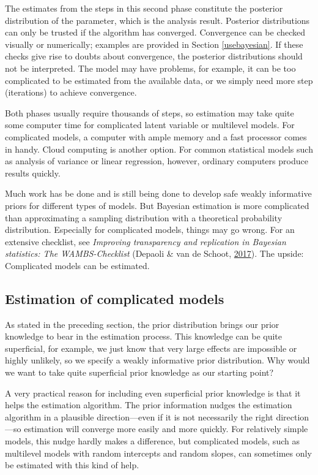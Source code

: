 \documentclass[doc]{apa6}
\begin{document}
The estimates from the steps in this second phase constitute the
posterior distribution of the parameter, which is the analysis result.
Posterior distributions can only be trusted if the algorithm has
converged. Convergence can be checked visually or numerically; examples
are provided in Section \ref{usebayesian}. If these checks give rise to
doubts about convergence, the posterior distributions should not be
interpreted. The model may have problems, for example, it can be too
complicated to be estimated from the available data, or we simply need
more step (iterations) to achieve convergence.

Both phases usually require thousands of steps, so estimation may take
quite some computer time for complicated latent variable or multilevel
models. For complicated models, a computer with ample memory and a fast
processor comes in handy. Cloud computing is another option. For common
statistical models such as analysis of variance or linear regression,
however, ordinary computers produce results quickly.

Much work has be done and is still being done to develop safe weakly
informative priors for different types of models. But Bayesian
estimation is more complicated than approximating a sampling
distribution with a theoretical probability distribution. Especially for
complicated models, things may go wrong. For an extensive checklist, see
\emph{Improving transparency and replication in Bayesian statistics: The
WAMBS-Checklist} (Depaoli \& van de Schoot,
\protect\hyperlink{ref-depaoliImprovingTransparencyReplication2017}{2017}).
The upside: Complicated models can be estimated.

\subsection{Estimation of complicated
models}\label{estimation-of-complicated-models}

As stated in the preceding section, the prior distribution brings our
prior knowledge to bear in the estimation process. This knowledge can be
quite superficial, for example, we just know that very large effects are
impossible or highly unlikely, so we specify a weakly informative prior
distribution. Why would we want to take quite superficial prior
knowledge as our starting point?

A very practical reason for including even superficial prior knowledge
is that it helps the estimation algorithm. The prior information nudges
the estimation algorithm in a plausible direction---even if it is not
necessarily the right direction---so estimation will converge more
easily and more quickly. For relatively simple models, this nudge hardly
makes a difference, but complicated models, such as multilevel models
with random intercepts and random slopes, can sometimes only be
estimated with this kind of help.
\end{document}
